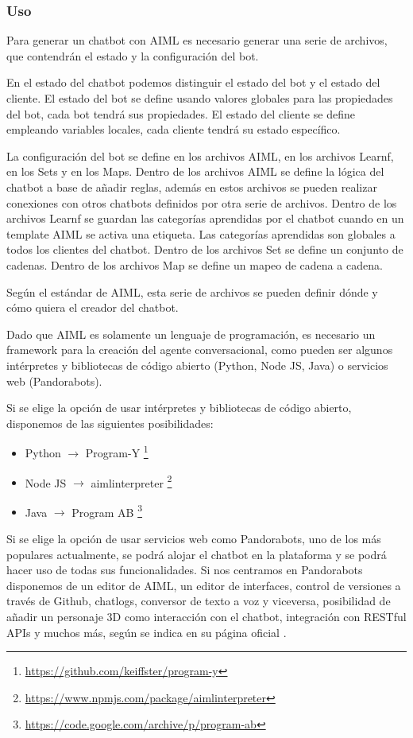 \subsubsection*{Uso}

Para generar un chatbot con AIML es necesario generar una serie de archivos, que contendrán el estado y la configuración del bot.

En el estado del chatbot podemos distinguir el estado del bot y el estado del cliente. El estado del bot se define usando valores globales para las propiedades del bot, cada bot tendrá sus propiedades. El estado del cliente se define empleando variables locales, cada cliente tendrá su estado específico.

La configuración del bot se define en los archivos AIML, en los archivos Learnf, en los Sets y en los Maps. Dentro de los archivos AIML se define la lógica del chatbot a base de añadir reglas, además en estos archivos se pueden realizar conexiones con otros chatbots definidos por otra serie de archivos. Dentro de los archivos Learnf se guardan las categorías aprendidas por el chatbot cuando en un template AIML se activa una etiqueta. Las categorías aprendidas son globales a todos los clientes del chatbot. Dentro de los archivos Set se define un conjunto de cadenas. Dentro de los archivos Map se define un mapeo de cadena a cadena.

Según el estándar de AIML, esta serie de archivos se pueden definir dónde y cómo quiera el creador del chatbot.

Dado que AIML es solamente un lenguaje de programación, es necesario un \gls{framework} para la creación del agente conversacional, como pueden ser algunos intérpretes y bibliotecas de código abierto (Python, Node JS, Java) o servicios web (Pandorabots).

Si se elige la opción de usar intérpretes y bibliotecas de código abierto, disponemos de las siguientes posibilidades:

\begin{itemize}
\item Python $\rightarrow$ Program-Y \footnote{\url{https://github.com/keiffster/program-y}}
\item Node JS $\rightarrow$ aimlinterpreter
\footnote{\url{https://www.npmjs.com/package/aimlinterpreter}}
\item Java $\rightarrow$ Program AB \footnote{\url{https://code.google.com/archive/p/program-ab}}
\end{itemize}

Si se elige la opción de usar servicios web como Pandorabots, uno de los más populares actualmente, se podrá alojar el chatbot en la plataforma y se podrá hacer uso de todas sus funcionalidades. Si nos centramos en Pandorabots disponemos de un editor de AIML, un editor de interfaces, control de versiones a través de Github, chatlogs, conversor de texto a voz y viceversa, posibilidad de añadir un personaje 3D como interacción con el chatbot, integración con RESTful \glspl{API} y muchos más, según se indica en su página oficial \cite{RefWorks:RefID:14-pandorabots:}.

